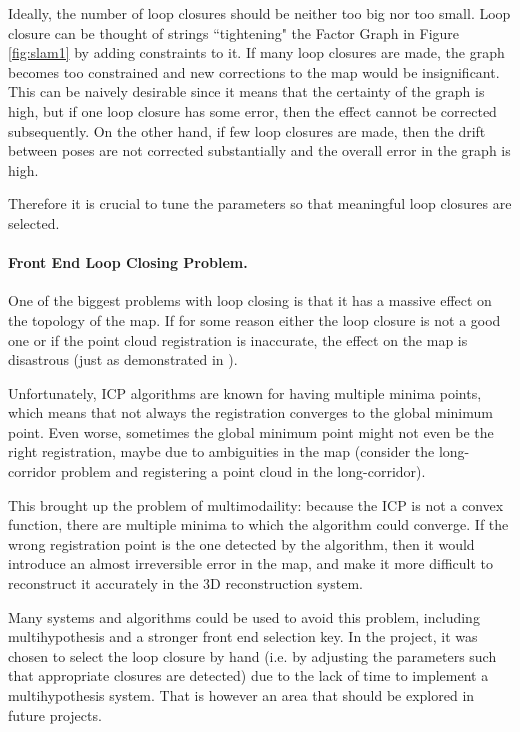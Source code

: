 \documentclass[11pt]{article}
\begin{document}
Ideally, the number of loop closures should be neither too big nor too small. Loop closure can be thought of strings ``tightening" the Factor Graph in Figure \ref{fig:slam1} by adding constraints to it. If many loop closures are made, the graph becomes too constrained and new corrections to the map would be insignificant. This can be naively desirable since it means that the certainty of the graph is high, but if one loop closure has some error, then the effect cannot be corrected subsequently. On the other hand, if few loop closures are made, then the drift between poses are not corrected substantially and the overall error in the graph is high.
	
Therefore it is crucial to tune the parameters so that meaningful loop closures are selected. 

\paragraph{Front End Loop Closing Problem.} One of the biggest problems with loop closing is that it has a massive effect on the topology of the map. If for some reason either the loop closure is not a good one or if the point cloud registration is inaccurate, the effect on the map is disastrous (just as demonstrated in \cite{latif2013robust}).
	
Unfortunately, ICP algorithms are known for having multiple minima points, which means that not always the registration converges to the global minimum point. Even worse, sometimes the global minimum point might not even be the right registration, maybe due to ambiguities in the map (consider the long-corridor problem and registering a point cloud in the long-corridor).
	
This brought up the problem of multimodaility: because the ICP is not a convex function, there are multiple minima to which the algorithm could converge. If the wrong registration point is the one detected by the algorithm, then it would introduce an almost irreversible error in the map, and make it more difficult to reconstruct it accurately in the 3D reconstruction system.
	
Many systems and algorithms could be used to avoid this problem, including multihypothesis and a stronger front end selection key. In the project, it was chosen to select the loop closure by hand (i.e. by adjusting the parameters such that appropriate closures are detected) due to the lack of time to implement a multihypothesis system. That is however an area that should be explored in future projects.
\end{document}
